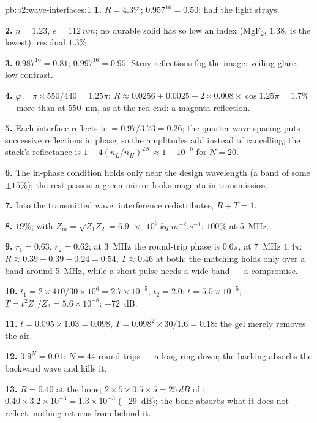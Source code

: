 \begin{solution}{pb:b2:wave-interfaces:1}
\textbf{1.} $R = 4.3\%$; $0.957^{16} = 0.50$; half the light strays.

\textbf{2.} $n = 1.23$, $e = \qty{112}{nm}$; no durable solid has so low an
index (MgF$_2$, $1.38$, is the lowest): residual $1.3\%$.

\textbf{3.} $0.987^{16} = 0.81$; $0.997^{16} = 0.95$. Stray reflections fog the
image: veiling glare, low contrast.

\textbf{4.} $\varphi = \pi \times 550/440 = 1.25\pi$: $R \approx 0.0256 + 0.0025 + 2 \times 0.008 \times
\cos1.25\pi = 1.7\%$ --- more than at \qty{550}{nm}, as at the red end: a
magenta reflection.

\textbf{5.} Each interface reflects $|r| = 0.97/3.73 = 0.26$; the quarter-wave
spacing puts successive reflections in phase, so the amplitudes add
instead of cancelling; the stack's reflectance is $1 - 4(n_L/n_H)^{2N}
\approx 1 - 10^{-9}$ for $N = 20$.

\textbf{6.} The in-phase condition holds only near the design
wavelength (a band of some $\pm15\%$); the rest passes: a green mirror
looks magenta in transmission.

\textbf{7.} Into the transmitted wave: interference redistributes,
$R + T = 1$.

\textbf{8.} $19\%$; with $Z_m = \sqrt{Z_1Z_2} = \qty{6.9e6}{kg.m^{-2}.s^{-1}}$: $100\%$ at
\qty{5}{MHz}.

\textbf{9.} $r_1 = 0.63$, $r_2 = 0.62$; at \qty{3}{MHz} the round-trip phase is
$0.6\pi$, at \qty{7}{MHz} $1.4\pi$: $R \approx 0.39 + 0.39 - 0.24 = 0.54$, $T \approx 0.46$
at both: the matching holds only over a band around \qty{5}{MHz}, while a
short pulse needs a wide band --- a compromise.

\textbf{10.} $t_1 = 2 \times 410/30 \times 10^6 = 2.7 \times 10^{-5}$, $t_2 = 2.0$: $t = 5.5 \times 10^{-5}$,
$T = t^2Z_1/Z_3 = 5.6 \times 10^{-8}$: \qty{-72}{dB}.

\textbf{11.} $t = 0.095 \times 1.03 = 0.098$, $T = 0.098^2 \times 30/1.6 = 0.18$: the gel
merely removes the air.

\textbf{12.} $0.9^N = 0.01$: $N = 44$ round trips --- a long ring-down; the
backing absorbs the backward wave and kills it.

\textbf{13.} $R = 0.40$ at the bone; $2 \times 5 \times 0.5 \times 5 = \qty{25}{dB}$ of
: $0.40 \times 3.2 \times 10^{-3} = 1.3 \times 10^{-3}$ (\qty{-29}{dB}); the bone
absorbs what it does not reflect: nothing returns from behind it.


\end{solution}
